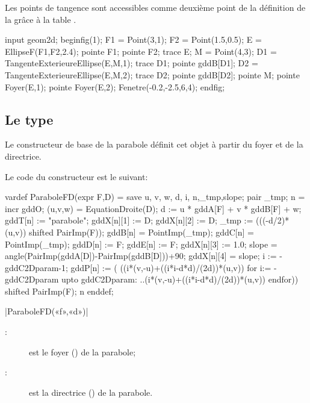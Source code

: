 \documentclass[a4paper,french]{article}
\begin{document}
Les points de tangence sont accessibles comme deuxième point de la définition de
la  grâce à la table .

\begin{ExempleMP}
input geom2d;
beginfig(1);
F1 = Point(3,1);
F2 = Point(1.5,0.5);
E = EllipseF(F1,F2,2.4);
pointe F1; pointe F2;
trace E;
M = Point(4,3);
D1 = TangenteExterieureEllipse(E,M,1);
trace D1;
pointe gddB[D1];
D2 = TangenteExterieureEllipse(E,M,2);
trace D2;
pointe gddB[D2];
pointe M;
pointe Foyer(E,1);
pointe Foyer(E,2);
Fenetre(-0.2,-2.5,6,4);
endfig;
\end{ExempleMP}

\subsection{Le type }

Le constructeur de base de la parabole définit cet objet à partir du foyer et
de la directrice. 

Le code du constructeur est le suivant:
\begin{mpcode}
vardef ParaboleFD(expr F,D) =
  save u, v, w, d, i, n,_tmp,slope; 
  pair _tmp;
  n = incr gddO;
  (u,v,w) = EquationDroite(D);
  d := u * gddA[F] + v * gddB[F] + w;
  gddT[n] := "parabole"; 
  gddX[n][1] := D; %
  gddX[n][2] := D; %
  _tmp := (((-d/2)*(u,v)) shifted PairImp(F));
  gddB[n] = PointImp(_tmp);
  gddC[n] = PointImp(_tmp);
  gddD[n] := F;
  gddE[n] := F;
  gddX[n][3] := 1.0; %
  slope = angle(PairImp(gddA[D])-PairImp(gddB[D]))+90;
  gddX[n][4] = slope;
  i := -gddC2Dparam-1;
  gddP[n] := (
    ((i*(v,-u)+((i*i-d*d)/(2d))*(u,v))
    for i:= -gddC2Dparam upto gddC2Dparam:
      ..(i*(v,-u)+((i*i-d*d)/(2d))*(u,v))
    endfor)) shifted PairImp(F);
   n
enddef;
\end{mpcode}

\begin{colourband}
  \macro|ParaboleFD(«f»,«d»)|
  \begin{description}
    \item[:] est le foyer () de la parabole;
    \item[:] est la directrice () de la parabole.
  \end{description}
\end{colourband}
\end{document}
